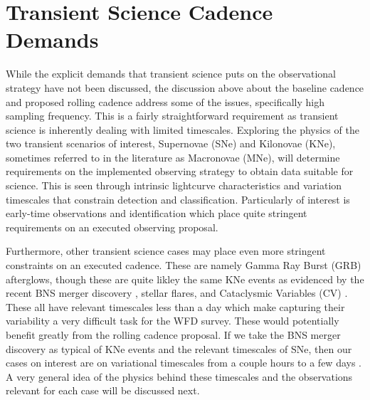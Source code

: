 \documentclass[12pt]{article}
\begin{document}
\section{Transient Science Cadence Demands} %
While the explicit demands that transient science puts on the observational strategy have not been discussed, the discussion above about the baseline cadence and proposed rolling cadence address some of the issues, specifically high sampling frequency. This is a fairly straightforward requirement as transient science is inherently dealing with limited timescales. Exploring the physics of the two transient scenarios of interest, Supernovae (SNe) and Kilonovae (KNe), sometimes referred to in the literature as Macronovae (MNe), will determine requirements on the implemented observing strategy to obtain data suitable for science. This is seen through intrinsic lightcurve characteristics and variation timescales that constrain detection and classification. Particularly of interest is early-time observations and identification which place quite stringent requirements on an executed observing proposal. \par
Furthermore, other transient science cases may place even more stringent constraints on an executed cadence. These are namely Gamma Ray Burst (GRB) afterglows, though these are quite likley the same KNe events as evidenced by the recent BNS merger discovery , stellar flares, and Cataclysmic Variables (CV) \citep{Villar2017}. These all have relevant timescales less than a day which make capturing their variability a very difficult task for the WFD survey. These would potentially benefit greatly from the rolling cadence proposal. If we take the BNS merger discovery as typical of KNe events and the relevant timescales of SNe, then our cases on interest are on variational timescales from a couple hours to a few days \citep{LSSTScienceCollaboration2017}. A very general idea of the physics behind these timescales and the observations relevant for each case will be discussed next.\par
\end{document}
